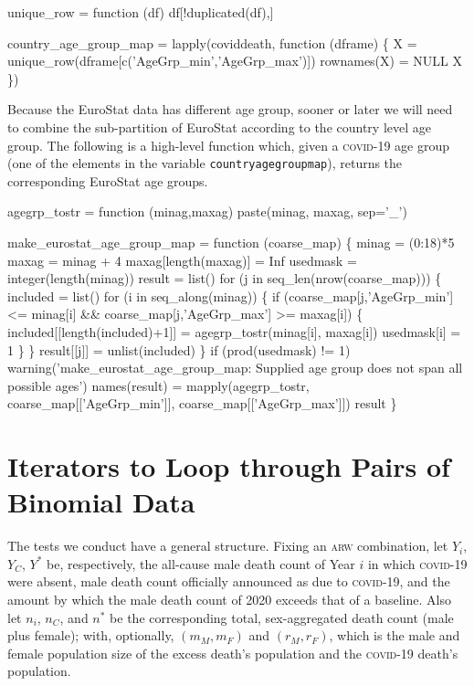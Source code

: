 \documentclass{article}
\begin{document}
\nwenddocs{}\plusendmoddef
unique_row = function (df) df[!duplicated(df),]
\nwendcode{}\nwdocspar

\nwenddocs{}\endmoddef
country_age_group_map = lapply(coviddeath, function (dframe) \{
    X = unique_row(dframe[c('AgeGrp_min','AgeGrp_max')])
    rownames(X) = NULL
    X
\})
\nwendcode{}\nwdocspar

Because the EuroStat data has different age group, sooner or later we will need to
combine the sub-partition of EuroStat according to the country level age group. The
following is a high-level function which, given a \textsc{covid}-19 age group (one of the elements
in the variable {\tt{}country{}age{}group{}map}), returns the corresponding EuroStat age
groups.

\nwenddocs{}\plusendmoddef
agegrp_tostr = function (minag,maxag)
    paste(minag, maxag, sep='_')

make_eurostat_age_group_map = function (coarse_map) \{
    minag = (0:18)*5
    maxag = minag + 4
    maxag[length(maxag)] = Inf
    usedmask = integer(length(minag))
    result = list()
    for (j in seq_len(nrow(coarse_map))) \{
        included = list()
        for (i in seq_along(minag)) \{
            if (coarse_map[j,'AgeGrp_min'] <= minag[i] && coarse_map[j,'AgeGrp_max'] >= maxag[i]) \{
                included[[length(included)+1]] = agegrp_tostr(minag[i], maxag[i])
                usedmask[i] = 1
            \}
        \}
        result[[j]] = unlist(included)
    \}
    if (prod(usedmask) != 1)
        warning('make_eurostat_age_group_map: Supplied age group does not span all possible ages')
    names(result) = mapply(agegrp_tostr, coarse_map[['AgeGrp_min']], coarse_map[['AgeGrp_max']])
    result
\}
\nwendcode{}\nwdocspar


\section{Iterators to Loop through Pairs of Binomial Data}

The tests we conduct have a general structure.  Fixing an \textsc{arw} combination, let $Y_{i}$, $Y_{C}$, $Y^*$ be,
respectively, the all-cause male death count of Year $i$ in which \textsc{covid}-19 were absent, male death count officially
announced as due to \textsc{covid}-19, and the amount by which the male death count of 2020 exceeds that of a baseline. Also let $n_{i}$,
$n_C$, and $n^*$ be the corresponding total, sex-aggregated death count (male plus female); with, optionally, $(m_M,m_F)$
and $(r_M,r_F)$, which is the male and female population size of the excess death's population and the \textsc{covid}-19
death's population.
\end{document}
